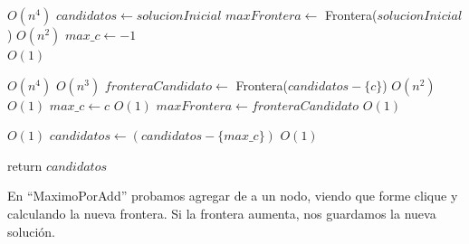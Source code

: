 \begin{algorithm}[H]
\begin{algorithmic}
                      \Comment $O(n^4)$
    \State $candidatos \gets solucionInicial$
    \State $maxFrontera \gets$ Frontera($solucionInicial$)      \Comment $O(n^2)$
    \State $max\_c \gets -1$  \\                                \Comment $O(1)$

                                                    \Comment $O(n^4)$
                                         \Comment $O(n^3)$
            \State $fronteraCandidato \gets$ Frontera($candidatos - \{c\}$) \Comment $O(n^2)$
                                      \Comment $O(1)$
                \State $max\_c \gets c$                                     \Comment $O(1)$
                \State $maxFrontera \gets fronteraCandidato$                \Comment $O(1)$ \\
            \EndIf
        \EndIf
    \EndFor

                                               \Comment $O(1)$
        \State $candidatos \gets (candidatos - \{max\_c\})$         \Comment $O(1)$
    \EndIf

    \State return $candidatos$

\EndFunction
\end{algorithmic}
\end{algorithm}

En ``MaximoPorAdd'' probamos agregar de a un nodo, viendo que forme clique y calculando la nueva frontera. Si la frontera aumenta, nos guardamos la nueva solución.


